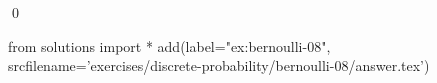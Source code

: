 
\begin{ex} 
  \label{ex:bernoulli-08}
  
  \qed
\end{ex} 
\begin{python0}
from solutions import *
add(label="ex:bernoulli-08",
    srcfilename='exercises/discrete-probability/bernoulli-08/answer.tex') 
\end{python0}
